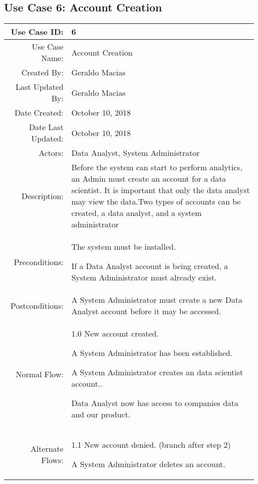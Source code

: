 \documentclass[12pt,oneside,letterpaper]{article}
\newenvironment{packed_enumerate}{ %
\vspace{-7mm}
\begin{enumerate}
  \setlength{\itemsep}{0pt}
  \setlength{\parskip}{0pt}
  \setlength{\parsep}{0pt}
}{\end{enumerate}
\vspace{-8mm}}
\begin{document}
\subsection{\label{Upload Data Sets}Use Case 6: Account Creation}

\begin{longtable}{|r|p{3.8in}|}
\hline
Use Case ID:&6\\
\hline
Use Case Name:&Account Creation\\
\hline
Created By:&Geraldo Macias\\
\hline
Last Updated By:&Geraldo Macias\\
\hline
Date Created:&October 10, 2018\\
\hline
Date Last Updated:&October 10, 2018\\
\hline
Actors:&Data Analyst, System Administrator\\
\hline
Description:&Before the system can start to perform analytics, an Admin must create an account for a data scientist. It is important that only the data analyst may view the data.Two types of accounts can be created, a data analyst, and a system administrator\\
\hline
Preconditions:&\begin{packed_enumerate}
\item The system must be installed.
\item If a Data Analyst account is being created, a System Administrator must already exist.
\end{packed_enumerate}\\
\hline
Postconditions:&A System Administrator must create a new Data Analyst account before it may be accessed.\\
\hline
Normal Flow:&1.0 New account created.\newline
\begin{packed_enumerate}
\item A System Administrator has been established.
\item A System Administrator creates an data scientist account..
\item Data Analyst now has access to companies data and our product.
\end{packed_enumerate}\\
\hline
Alternate Flows:&1.1 New account denied. (branch after step 2)\newline
\begin{packed_enumerate}
\item A System Administrator deletes an account.

\end{packed_enumerate}
\end{longtable}
\end{document}
